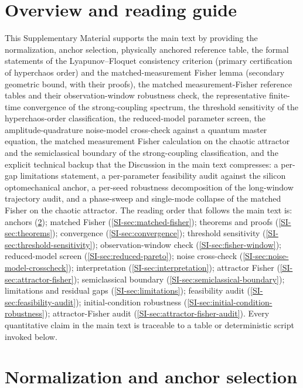 \documentclass[Phys]{SciPost}
\begin{document}
\section{Overview and reading guide}
This Supplementary Material supports the main text by providing the
normalization, anchor selection, physically anchored reference table, the
formal statements of the Lyapunov--Floquet consistency criterion (primary
certification of hyperchaos order) and the matched-measurement Fisher lemma
(secondary geometric bound, with their proofs), the matched measurement-Fisher
reference tables and their observation-window robustness check, the
representative finite-time convergence of the strong-coupling spectrum, the
threshold sensitivity of the hyperchaos-order classification, the
reduced-model parameter screen, the amplitude-quadrature noise-model
cross-check against a quantum master equation, the matched measurement
Fisher calculation on the chaotic attractor and the semiclassical boundary of
the strong-coupling classification, and the explicit technical backup that
the Discussion in the main text compresses: a per-gap limitations statement,
a per-parameter feasibility audit against the silicon optomechanical anchor,
a per-seed robustness decomposition of the long-window trajectory audit, and
a phase-sweep and single-mode collapse of the matched Fisher on the chaotic
attractor. The reading order that follows the main text is: anchors
(\cref{SI-sec:anchor}); matched Fisher (\cref{SI-sec:matched-fisher});
theorems and proofs (\cref{SI-sec:theorems}); convergence
(\cref{SI-sec:convergence}); threshold sensitivity
(\cref{SI-sec:threshold-sensitivity}); observation-window check
(\cref{SI-sec:fisher-window}); reduced-model screen
(\cref{SI-sec:reduced-pareto}); noise cross-check
(\cref{SI-sec:noise-model-crosscheck}); interpretation
(\cref{SI-sec:interpretation}); attractor Fisher
(\cref{SI-sec:attractor-fisher}); semiclassical boundary
(\cref{SI-sec:semiclassical-boundary}); limitations and residual gaps
(\cref{SI-sec:limitations}); feasibility audit
(\cref{SI-sec:feasibility-audit}); initial-condition robustness
(\cref{SI-sec:initial-condition-robustness}); attractor-Fisher audit
(\cref{SI-sec:attractor-fisher-audit}). Every
quantitative claim in the main text is traceable to a table or
deterministic script invoked below.

\section{Normalization and anchor selection}
\label{SI-sec:anchor}
\end{document}
